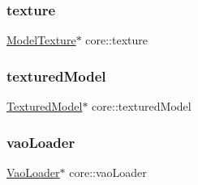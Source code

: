 \mbox{\label{namespacecore_a0738503bf610d37d44b4938dc024bfcc}} 
\subsubsection{\texorpdfstring{texture}{texture}}
{\footnotesize\ttfamily \hyperlink{classtexture_1_1ModelTexture}{Model\+Texture}$\ast$ core\+::texture}

\mbox{\label{namespacecore_ad4d5c25548862489d6a237342748ad74}} 
\subsubsection{\texorpdfstring{textured\+Model}{texturedModel}}
{\footnotesize\ttfamily \hyperlink{classmodel_1_1TexturedModel}{Textured\+Model}$\ast$ core\+::textured\+Model}

\mbox{\label{namespacecore_a78dd24784c415d3759a0f71b8f4f9f81}} 
\subsubsection{\texorpdfstring{vao\+Loader}{vaoLoader}}
{\footnotesize\ttfamily \hyperlink{classcore_1_1VaoLoader}{Vao\+Loader}$\ast$ core\+::vao\+Loader}

